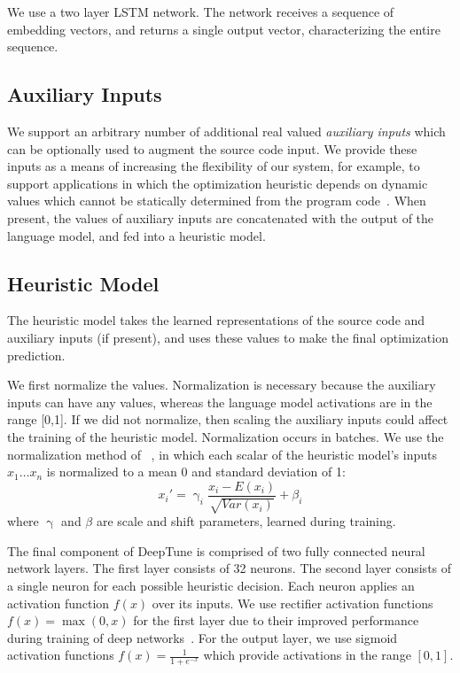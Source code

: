 We use a two layer LSTM network. The network receives a sequence of embedding vectors, and returns a single output vector, characterizing the entire sequence.


\subsection{Auxiliary Inputs}

We support an arbitrary number of additional real valued \emph{auxiliary inputs} which can be optionally used to augment the source code input. We provide these inputs as a means of increasing the flexibility of our system, for example, to support applications in which the optimization heuristic depends on dynamic values which cannot be statically determined from the program code~\cite{Ding2015,Stephenson2005}. When present, the values of auxiliary inputs are concatenated with the output of the language model, and fed into a heuristic model.


\subsection{Heuristic Model}

The heuristic model takes the learned representations of the source code and auxiliary inputs (if present), and uses these values to make the final optimization prediction.

We first normalize the values. Normalization is necessary because the auxiliary inputs can have any values, whereas the language model activations are in the range [0,1]. If we did not normalize, then scaling the auxiliary inputs could affect the training of the heuristic model. Normalization occurs in batches. We use the normalization method of ~\cite{Ioffe2015a}, in which each scalar of the heuristic model's inputs $x_1 \ldots x_n$ is normalized to a mean 0 and standard deviation of 1:
%
\begin{equation}
  x_i' = \upgamma_i \frac{x_i - E(x_i)}{\sqrt{Var(x_i)}} + \beta_i
\end{equation}
%
where $\upgamma$ and $\beta$ are scale and shift parameters, learned during training.

The final component of DeepTune is comprised of two fully connected neural network layers. The first layer consists of 32 neurons. The second layer consists of a single neuron for each possible heuristic decision. Each neuron applies an activation function $f(x)$ over its inputs. We use rectifier activation functions $f(x) = \max(0, x)$ for the first layer due to their improved performance during training of deep networks~\cite{Nair2010}. For the output layer, we use sigmoid activation functions $f(x) = \frac{1}{1+e^{-x}}$ which provide activations in the range $[0,1]$.

